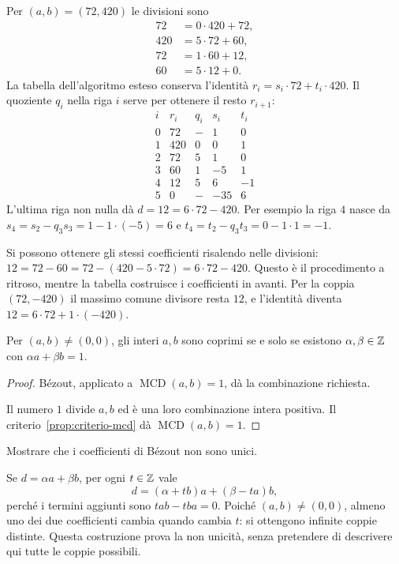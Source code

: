 \begin{esempio}
Per $(a,b)=(72,420)$ le divisioni sono
\[
\begin{aligned}
72&=0\cdot420+72,\\
420&=5\cdot72+60,\\
72&=1\cdot60+12,\\
60&=5\cdot12+0.
\end{aligned}
\]
La tabella dell'algoritmo esteso conserva l'identità $r_i=s_i\cdot72+t_i\cdot420$. Il quoziente $q_i$ nella riga $i$ serve per ottenere il resto $r_{i+1}$:
\[
\begin{array}{c|r|r|r|r}
i&r_i&q_i&s_i&t_i\\\hline
0&72&-&1&0\\
1&420&0&0&1\\
2&72&5&1&0\\
3&60&1&-5&1\\
4&12&5&6&-1\\
5&0&-&-35&6
\end{array}
\]
L'ultima riga non nulla dà $d=12=6\cdot72-420$. Per esempio la riga $4$ nasce da $s_4=s_2-q_3s_3=1-1\cdot(-5)=6$ e $t_4=t_2-q_3t_3=0-1\cdot1=-1$.

Si possono ottenere gli stessi coefficienti risalendo nelle divisioni: $12=72-60=72-(420-5\cdot72)=6\cdot72-420$. Questo è il procedimento a ritroso, mentre la tabella costruisce i coefficienti in avanti. Per la coppia $(72,-420)$ il massimo comune divisore resta $12$, e l'identità diventa $12=6\cdot72+1\cdot(-420)$.
\end{esempio}

\begin{corollario}
Per $(a,b)\ne(0,0)$, gli interi $a,b$ sono coprimi se e solo se esistono $\alpha,\beta\in\mathbb{Z}$ con $\alpha a+\beta b=1$.
\end{corollario}
\begin{proof}
\passomath{\Rightarrow} Bézout, applicato a $\operatorname{MCD}(a,b)=1$, dà la combinazione richiesta.

\passomath{\Leftarrow} Il numero $1$ divide $a,b$ ed è una loro combinazione intera positiva. Il criterio~\ref{prop:criterio-mcd} dà $\operatorname{MCD}(a,b)=1$.
\end{proof}

\begin{esercizio}
Mostrare che i coefficienti di Bézout non sono unici.
\end{esercizio}
\begin{svolgimento}
Se $d=\alpha a+\beta b$, per ogni $t\in\mathbb{Z}$ vale
\[
d=(\alpha+tb)a+(\beta-ta)b,
\]
perché i termini aggiunti sono $tab-tba=0$. Poiché $(a,b)\ne(0,0)$, almeno uno dei due coefficienti cambia quando cambia $t$: si ottengono infinite coppie distinte. Questa costruzione prova la non unicità, senza pretendere di descrivere qui tutte le coppie possibili.
\end{svolgimento}

